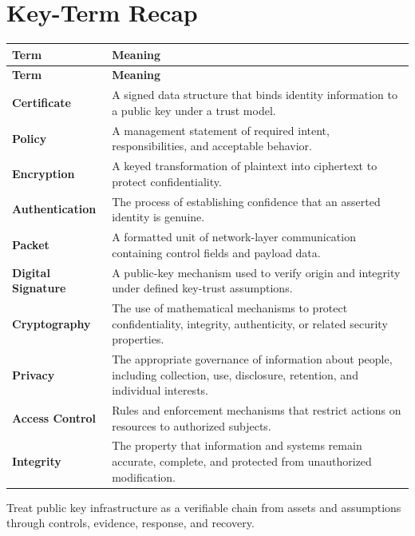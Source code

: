 \documentclass[11pt]{article}
\begin{document}
\section*{Key-Term Recap}
\begin{longtable}{>{\RaggedRight\arraybackslash}p{}>{\RaggedRight\arraybackslash}p{}}
\toprule\rowcolor{Navy}\color{white}\textbf{Term} & \color{white}\textbf{Meaning}\\\midrule
\endfirsthead
\toprule\rowcolor{Navy}\color{white}\textbf{Term} & \color{white}\textbf{Meaning}\\\midrule
\endhead
\textbf{Certificate} & A signed data structure that binds identity information to a public key under a trust model. \\\midrule
\textbf{Policy} & A management statement of required intent, responsibilities, and acceptable behavior. \\\midrule
\textbf{Encryption} & A keyed transformation of plaintext into ciphertext to protect confidentiality. \\\midrule
\textbf{Authentication} & The process of establishing confidence that an asserted identity is genuine. \\\midrule
\textbf{Packet} & A formatted unit of network-layer communication containing control fields and payload data. \\\midrule
\textbf{Digital Signature} & A public-key mechanism used to verify origin and integrity under defined key-trust assumptions. \\\midrule
\textbf{Cryptography} & The use of mathematical mechanisms to protect confidentiality, integrity, authenticity, or related security properties. \\\midrule
\textbf{Privacy} & The appropriate governance of information about people, including collection, use, disclosure, retention, and individual interests. \\\midrule
\textbf{Access Control} & Rules and enforcement mechanisms that restrict actions on resources to authorized subjects. \\\midrule
\textbf{Integrity} & The property that information and systems remain accurate, complete, and protected from unauthorized modification. \\\midrule
\bottomrule
\end{longtable}
\begin{takeawaybox}
Treat public key infrastructure as a verifiable chain from assets and assumptions through controls, evidence, response, and recovery.
\end{takeawaybox}
\end{document}
